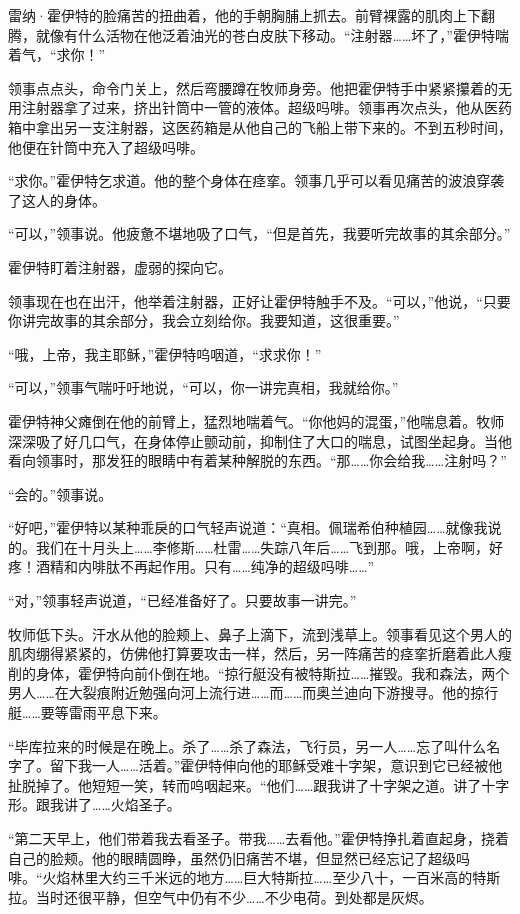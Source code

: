 \documentclass[AutoFakeBold=true]{book}
\begin{document}
雷纳·霍伊特的脸痛苦的扭曲着，他的手朝胸脯上抓去。前臂裸露的肌肉上下翻腾，就像有什么活物在他泛着油光的苍白皮肤下移动。``注射器……坏了，''霍伊特喘着气，``求你！''

领事点点头，命令门关上，然后弯腰蹲在牧师身旁。他把霍伊特手中紧紧攥着的无用注射器拿了过来，挤出针筒中一管的液体。超级吗啡。领事再次点头，他从医药箱中拿出另一支注射器，这医药箱是从他自己的飞船上带下来的。不到五秒时间，他便在针筒中充入了超级吗啡。

``求你。''霍伊特乞求道。他的整个身体在痉挛。领事几乎可以看见痛苦的波浪穿袭了这人的身体。

``可以，''领事说。他疲惫不堪地吸了口气，``但是首先，我要听完故事的其余部分。''

霍伊特盯着注射器，虚弱的探向它。

领事现在也在出汗，他举着注射器，正好让霍伊特触手不及。``可以，''他说，``只要你讲完故事的其余部分，我会立刻给你。我要知道，这很重要。''

``哦，上帝，我主耶稣，''霍伊特呜咽道，``求求你！''

``可以，''领事气喘吁吁地说，``可以，你一讲完真相，我就给你。''

霍伊特神父瘫倒在他的前臂上，猛烈地喘着气。``你他妈的混蛋，''他喘息着。牧师深深吸了好几口气，在身体停止颤动前，抑制住了大口的喘息，试图坐起身。当他看向领事时，那发狂的眼睛中有着某种解脱的东西。``那……你会给我……注射吗？''

``会的。''领事说。

``好吧，''霍伊特以某种乖戾的口气轻声说道：``真相。佩瑞希伯种植园……就像我说的。我们在十月头上……李修斯……杜雷……失踪八年后……飞到那。哦，上帝啊，好疼！酒精和内啡肽不再起作用。只有……纯净的超级吗啡……''

``对，''领事轻声说道，``已经准备好了。只要故事一讲完。''

牧师低下头。汗水从他的脸颊上、鼻子上滴下，流到浅草上。领事看见这个男人的肌肉绷得紧紧的，仿佛他打算要攻击一样，然后，另一阵痛苦的痉挛折磨着此人瘦削的身体，霍伊特向前仆倒在地。``掠行艇没有被特斯拉……摧毁。我和森法，两个男人……在大裂痕附近勉强向河上流行进……而……而奥兰迪向下游搜寻。他的掠行艇……要等雷雨平息下来。

``毕库拉来的时候是在晚上。杀了……杀了森法，飞行员，另一人……忘了叫什么名字了。留下我一人……活着。''霍伊特伸向他的耶稣受难十字架，意识到它已经被他扯脱掉了。他短短一笑，转而呜咽起来。``他们……跟我讲了十字架之道。讲了十字形。跟我讲了……火焰圣子。

``第二天早上，他们带着我去看圣子。带我……去看他。''霍伊特挣扎着直起身，挠着自己的脸颊。他的眼睛圆睁，虽然仍旧痛苦不堪，但显然已经忘记了超级吗啡。``火焰林里大约三千米远的地方……巨大特斯拉……至少八十，一百米高的特斯拉。当时还很平静，但空气中仍有不少……不少电荷。到处都是灰烬。
\end{document}

